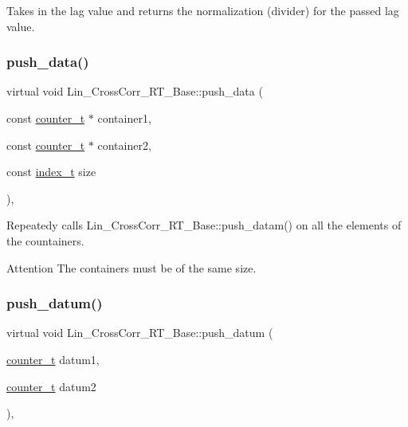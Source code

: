 Takes in the lag value and returns the normalization (divider) for the passed lag value. 

\mbox{\label{classLin__CrossCorr__RT__Base_a48faa93c6766605436fd8399949beb11}} 
\subsubsection{\texorpdfstring{push\+\_\+data()}{push\_data()}}
{\footnotesize\ttfamily virtual void Lin\+\_\+\+Cross\+Corr\+\_\+\+R\+T\+\_\+\+Base\+::push\+\_\+data (\begin{DoxyParamCaption}\item[{const \hyperlink{types_8hpp_ac89ac912f524b3e3fa3720ea55fec966}{counter\+\_\+t} $\ast$}]{container1,  }\item[{const \hyperlink{types_8hpp_ac89ac912f524b3e3fa3720ea55fec966}{counter\+\_\+t} $\ast$}]{container2,  }\item[{const \hyperlink{types_8hpp_a7c40bb931c31595ed6308605f4537447}{index\+\_\+t}}]{size }\end{DoxyParamCaption})\hspace{0.3cm}{\ttfamily [inline]}, {}}



Repeatedy calls {\ttfamily Lin\+\_\+\+Cross\+Corr\+\_\+\+R\+T\+\_\+\+Base\+::push\+\_\+datam()} on all the elements of the countainers. 

\begin{DoxyAttention}{Attention}
The containers must be of the same size. 
\end{DoxyAttention}
\mbox{\label{classLin__CrossCorr__RT__Base_abdc90b5ab6a5f7ac98e97b3d16261834}} 
\subsubsection{\texorpdfstring{push\+\_\+datum()}{push\_datum()}}
{\footnotesize\ttfamily virtual void Lin\+\_\+\+Cross\+Corr\+\_\+\+R\+T\+\_\+\+Base\+::push\+\_\+datum (\begin{DoxyParamCaption}\item[{\hyperlink{types_8hpp_ac89ac912f524b3e3fa3720ea55fec966}{counter\+\_\+t}}]{datum1,  }\item[{\hyperlink{types_8hpp_ac89ac912f524b3e3fa3720ea55fec966}{counter\+\_\+t}}]{datum2 }\end{DoxyParamCaption})\hspace{0.3cm}{\ttfamily [inline]}, {}}



